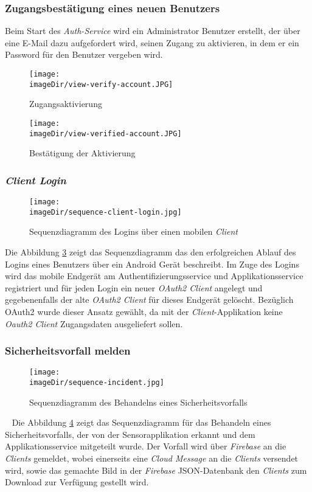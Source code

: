 \subsubsection{Zugangsbestätigung eines neuen Benutzers}
Beim Start des \emph{Auth-Service} wird ein Administrator Benutzer erstellt, der über eine E-Mail dazu aufgefordert wird, seinen Zugang zu aktivieren, in dem er ein Password für den Benutzer vergeben wird.
\begin{figure}[h]
	\centering
	\texttt{[image: \\imageDir/view-verify-account.JPG]}
	\caption{Zugangsaktivierung}
	\label{fig:image-veriy-account}
\end{figure}
\begin{figure}[h]
	\centering
	\texttt{[image: \\imageDir/view-verified-account.JPG]}
	\caption{Bestätigung der Aktivierung}
	\label{fig:image-veriied-account}
\end{figure}
\subsubsection{\emph{Client Login}}
\begin{figure}[h]
	\centering
	\texttt{[image: \\imageDir/sequence-client-login.jpg]}
	\caption{Sequenzdiagramm des Logins über einen mobilen \emph{Client}}
	\label{fig:image-sequence-client-login}
\end{figure}
Die Abbildung \ref{fig:image-sequence-client-login} zeigt das Sequenzdiagramm das den erfolgreichen Ablauf des Logins eines Benutzers über ein Android Gerät beschreibt. Im Zuge des Logins wird das mobile Endgerät am Authentifizierungsservice und Applikationsservice registriert und für jeden Login ein neuer \emph{OAuth2 Client} angelegt und gegebenenfalls der alte \emph{OAuth2 Client} für dieses Endgerät gelöscht. Bezüglich OAuth2 wurde dieser Ansatz gewählt, da mit der \emph{Client}-Applikation keine \emph{Oauth2 Client} Zugangsdaten ausgeliefert sollen.

\subsubsection{Sicherheitsvorfall melden}
\begin{figure}[h]
	\centering
	\texttt{[image: \\imageDir/sequence-incident.jpg]}
	\caption{Sequenzdiagramm des Behandelns eines Sicherheitsvorfalls}
	\label{fig:image-sequence-incident}
\end{figure}
\ \newline
Die Abbildung \ref{fig:image-sequence-incident} zeigt das Sequenzdiagramm für das Behandeln eines Sicherheitsvorfalls, der von der Sensorapplikation erkannt und dem Applikationsservice mitgeteilt wurde. Der Vorfall wird über \emph{Firebase} an die \emph{Clients} gemeldet, wobei einerseits eine \emph{Cloud Message} an die \emph{Clients} versendet wird, sowie das gemachte Bild in der \emph{Firebase} JSON-Datenbank den \emph{Clients} zum Download zur Verfügung gestellt wird.  
 

